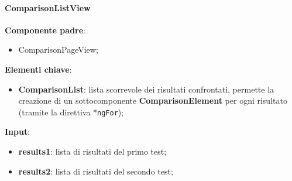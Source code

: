 \paragraph{ComparisonListView}
\textbf{Componente padre}:
\begin{itemize}
    \item ComparisonPageView;
\end{itemize}
\textbf{Elementi chiave}:
\begin{itemize}
    \item \textbf{ComparisonList}: lista scorrevole dei risultati confrontati, permette la creazione di un sottocomponente \textbf{ComparisonElement} per ogni risultato (tramite la direttiva *\texttt{ngFor});
\end{itemize}
\textbf{Input}:
\begin{itemize}
    \item \textbf{results1}: lista di risultati del primo test;
    \item \textbf{results2}: lista di risultati del secondo test;
\end{itemize}
